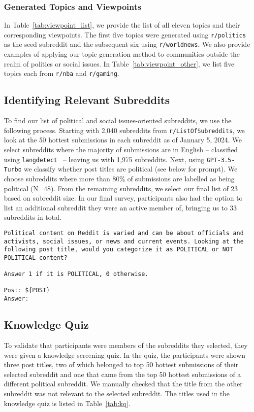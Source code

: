 \subsubsection{Generated Topics and Viewpoints}
In Table~\ref{tab:viewpoint_list}, we provide the list of all eleven topics and their corresponding viewpoints. The first five topics were generated using \texttt{r/politics} as the seed subreddit and the subsequent six using \texttt{r/worldnews}. We also provide examples of applying our topic generation method to communities outside the realm of politics or social issues. In Table~\ref{tab:viewpoint_other}, we list five topics each from \texttt{r/nba} and \texttt{r/gaming}.





\subsection{Identifying Relevant Subreddits}
To find our list of political and social issues-oriented subreddits, we use the following process. Starting with 2,040 subreddits from \texttt{r/ListOfSubreddits}, we look at the 50 hottest submissions in each subreddit as of January 5, 2024. We select subreddits where the majority of submissions are in English -- classified using \texttt{langdetect}~\cite{nakatani2010langdetect} -- leaving us with 1,975 subreddits. Next, using \texttt{GPT-3.5-Turbo} we classify whether post titles are political (see below for prompt). We choose subreddits where more than $80\%$ of submissions are labelled as being political (N=48). From the remaining subreddits, we select our final list of 23 based on subreddit size. In our final survey, participants also had the option to list an additional subreddit they were an active member of, bringing us to 33 subreddits in total. 


\begin{lstlisting}[style=gptprompt]
Political content on Reddit is varied and can be about officials and activists, social issues, or news and current events. Looking at the following post title, would you categorize it as POLITICAL or NOT POLITICAL content? 

Answer 1 if it is POLITICAL, 0 otherwise.

Post: ${POST}
Answer:
\end{lstlisting}
\subsection{Knowledge Quiz}
\label{sec:app_kq}
To validate that participants were members of the subreddits they selected, they were given a knowledge screening quiz. In the quiz, the participants were shown three post titles, two of which belonged to top 50 hottest submissions of their selected subreddit and one that came from the top 50 hottest submissions of a different political subreddit. We manually checked that the title from the other subreddit was not relevant to the selected subreddit. The titles used in the knowledge quiz is listed in Table~\ref{tab:kq}.  

